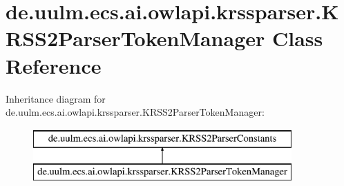 \hypertarget{classde_1_1uulm_1_1ecs_1_1ai_1_1owlapi_1_1krssparser_1_1_k_r_s_s2_parser_token_manager}{\section{de.\-uulm.\-ecs.\-ai.\-owlapi.\-krssparser.\-K\-R\-S\-S2\-Parser\-Token\-Manager Class Reference}
\label{classde_1_1uulm_1_1ecs_1_1ai_1_1owlapi_1_1krssparser_1_1_k_r_s_s2_parser_token_manager}
}
Inheritance diagram for de.\-uulm.\-ecs.\-ai.\-owlapi.\-krssparser.\-K\-R\-S\-S2\-Parser\-Token\-Manager\-:\begin{figure}[H]
\begin{center}
\leavevmode
\includegraphics[height=2.000000cm]{classde_1_1uulm_1_1ecs_1_1ai_1_1owlapi_1_1krssparser_1_1_k_r_s_s2_parser_token_manager}
\end{center}
\end{figure}
